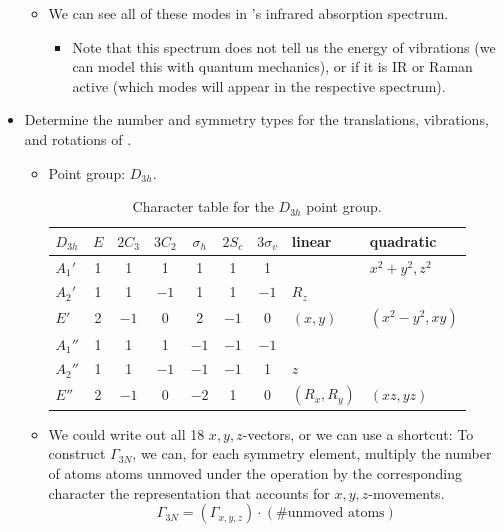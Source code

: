 \documentclass[../notes.tex]{subfiles}
\begin{document}
\begin{itemize}
\begin{itemize}
        \item We can see all of these modes in 's infrared absorption spectrum.
        \begin{itemize}
            \item Note that this spectrum does not tell us the energy of vibrations (we can model this with quantum mechanics), or if it is IR or Raman active (which modes will appear in the respective spectrum).
        \end{itemize}
    \end{itemize}
    \item Determine the number and symmetry types for the translations, vibrations, and rotations of .
    \begin{itemize}
        \item Point group: $D_{3h}$.
        \begin{table}[h!]
            \centering
            \small
            \renewcommand{\arraystretch}{1.2}
            \begin{tabular}{l|cccccc|l|l}
                $D_{3h}$ & $E$ & $2C_3$ & $3C_2$ & $\sigma_h$ & $2S_c$ & $3\sigma_v$ & linear & quadratic\\
                \hline
                $A_1'$ & 1 & 1 & 1 & 1 & 1 & 1 & & $x^2+y^2,z^2$\\
                $A_2'$ & 1 & 1 & $-1$ & 1 & 1 & $-1$ & $R_z$ & \\
                $E'$ & 2 & $-1$ & 0 & 2 & $-1$ & 0 & $(x,y)$ & $(x^2-y^2,xy)$\\
                $A_1''$ & 1 & 1 & 1 & $-1$ & $-1$ & $-1$ & & \\
                $A_2''$ & 1 & 1 & $-1$ & $-1$ & $-1$ & 1 & $z$ & \\
                $E''$ & 2 & $-1$ & 0 & $-2$ & 1 & 0 & $(R_x,R_y)$ & $(xz,yz)$\\
            \end{tabular}
            \caption{Character table for the $D_{3h}$ point group.}
            \label{tab:characterTable-D3h}
        \end{table}
        \item We could write out all 18 $x,y,z$-vectors, or we can use a shortcut: To construct $\Gamma_{3N}$, we can, for each symmetry element, multiply the number of atoms atoms unmoved under the operation by the corresponding character the representation that accounts for $x,y,z$-movements.
        \begin{equation*}
            \Gamma_{3N} = (\Gamma_{x,y,z})\cdot(\text{\# unmoved atoms})

\end{equation*}
\end{itemize}
\end{itemize}
\end{document}
